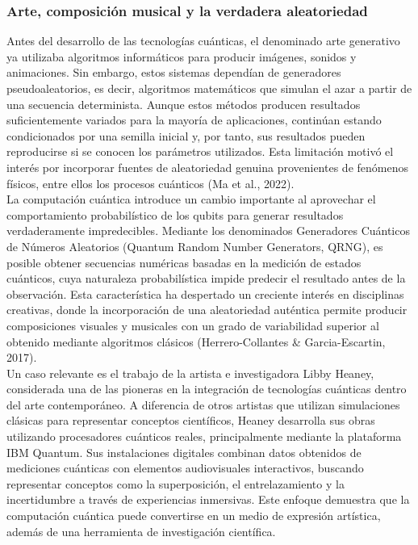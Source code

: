 \documentclass[12pt,a4paper]{article}
\begin{document}
\subsubsection{Arte, composición musical y la verdadera aleatoriedad}
Antes del desarrollo de las tecnologías cuánticas, el denominado arte generativo ya utilizaba algoritmos informáticos para producir imágenes, sonidos y animaciones. Sin embargo, estos sistemas dependían de generadores pseudoaleatorios, es decir, algoritmos matemáticos que simulan el azar a partir de una secuencia determinista. Aunque estos métodos producen resultados suficientemente variados para la mayoría de aplicaciones, continúan estando condicionados por una semilla inicial y, por tanto, sus resultados pueden reproducirse si se conocen los parámetros utilizados. Esta limitación motivó el interés por incorporar fuentes de aleatoriedad genuina provenientes de fenómenos físicos, entre ellos los procesos cuánticos (Ma et al., 2022).\\

La computación cuántica introduce un cambio importante al aprovechar el comportamiento probabilístico de los qubits para generar resultados verdaderamente impredecibles. Mediante los denominados Generadores Cuánticos de Números Aleatorios (Quantum Random Number Generators, QRNG), es posible obtener secuencias numéricas basadas en la medición de estados cuánticos, cuya naturaleza probabilística impide predecir el resultado antes de la observación. Esta característica ha despertado un creciente interés en disciplinas creativas, donde la incorporación de una aleatoriedad auténtica permite producir composiciones visuales y musicales con un grado de variabilidad superior al obtenido mediante algoritmos clásicos (Herrero-Collantes \& Garcia-Escartin, 2017).\\

Un caso relevante es el trabajo de la artista e investigadora Libby Heaney, considerada una de las pioneras en la integración de tecnologías cuánticas dentro del arte contemporáneo. A diferencia de otros artistas que utilizan simulaciones clásicas para representar conceptos científicos, Heaney desarrolla sus obras utilizando procesadores cuánticos reales, principalmente mediante la plataforma IBM Quantum. Sus instalaciones digitales combinan datos obtenidos de mediciones cuánticas con elementos audiovisuales interactivos, buscando representar conceptos como la superposición, el entrelazamiento y la incertidumbre a través de experiencias inmersivas. Este enfoque demuestra que la computación cuántica puede convertirse en un medio de expresión artística, además de una herramienta de investigación científica.\\
\end{document}
